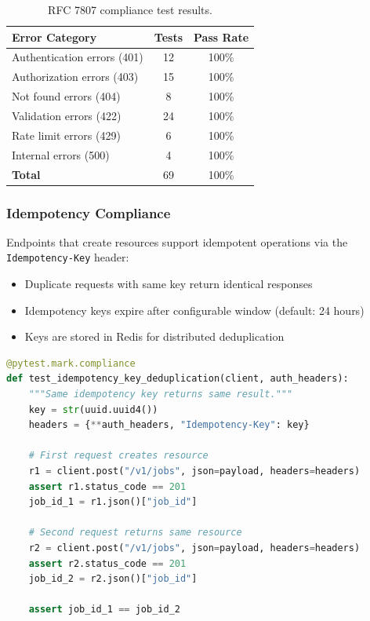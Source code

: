 \begin{table}[ht]
\centering
\caption{RFC 7807 compliance test results.}
\label{tab:rfc7807-compliance}
\small
\begin{tabular}{lcc}
\hline
\textbf{Error Category} & \textbf{Tests} & \textbf{Pass Rate} \\
\hline
Authentication errors (401) & 12 & 100\% \\
Authorization errors (403) & 15 & 100\% \\
Not found errors (404) & 8 & 100\% \\
Validation errors (422) & 24 & 100\% \\
Rate limit errors (429) & 6 & 100\% \\
Internal errors (500) & 4 & 100\% \\
\hline
\textbf{Total} & 69 & 100\% \\
\hline
\end{tabular}
\end{table}

\subsubsection{Idempotency Compliance}

Endpoints that create resources support idempotent operations via the \texttt{Idempotency-Key} header:

\begin{itemize}
    \item Duplicate requests with same key return identical responses
    \item Idempotency keys expire after configurable window (default: 24 hours)
    \item Keys are stored in Redis for distributed deduplication
\end{itemize}

\begin{lstlisting}[language=Python,caption={Idempotency test pattern.}]
@pytest.mark.compliance
def test_idempotency_key_deduplication(client, auth_headers):
    """Same idempotency key returns same result."""
    key = str(uuid.uuid4())
    headers = {**auth_headers, "Idempotency-Key": key}
    
    # First request creates resource
    r1 = client.post("/v1/jobs", json=payload, headers=headers)
    assert r1.status_code == 201
    job_id_1 = r1.json()["job_id"]
    
    # Second request returns same resource
    r2 = client.post("/v1/jobs", json=payload, headers=headers)
    assert r2.status_code == 201
    job_id_2 = r2.json()["job_id"]
    
    assert job_id_1 == job_id_2
\end{lstlisting}

